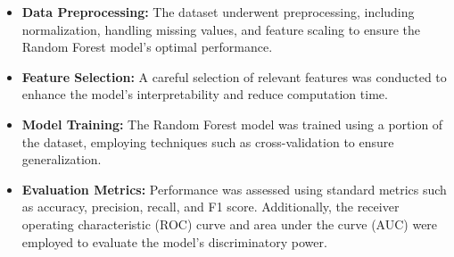 \documentclass[a4paper, 12pt]{article}
\begin{document}
\begin{itemize}
    \item \textbf{Data Preprocessing:} The dataset underwent preprocessing, including normalization, handling missing values, and feature scaling to ensure the Random Forest model's optimal performance.
    
    \item \textbf{Feature Selection:} A careful selection of relevant features was conducted to enhance the model's interpretability and reduce computation time.
    
    \item \textbf{Model Training:} The Random Forest model was trained using a portion of the dataset, employing techniques such as cross-validation to ensure generalization.
    
    \item \textbf{Evaluation Metrics:} Performance was assessed using standard metrics such as accuracy, precision, recall, and F1 score. Additionally, the receiver operating characteristic (ROC) curve and area under the curve (AUC) were employed to evaluate the model's discriminatory power.
\end{itemize}
\end{document}
